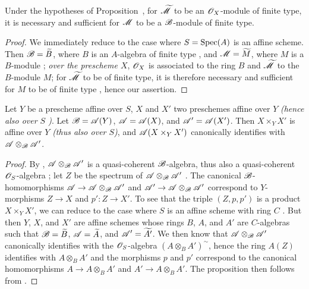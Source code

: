 \begin{corollary}[1.4.5]
\label{2.1.4.5}
Under the hypotheses of Proposition~, for $\widetilde{\mathscr{M}}$ to be an $\mathscr{O}_X$-module of finite type, it is necessary and sufficient for $\mathscr{M}$ to be a $\mathscr{B}$-module of finite type.
\end{corollary}

\begin{proof}
\label{proof-2.1.4.5}
We immediately reduce to the case where $S=\operatorname{Spec}(A)$ is an affine scheme.
Then $\mathscr{B}=\widetilde{B}$, where $B$ is an $A$-algebra of finite type , and $\mathscr{M}=\widetilde{M}$, where $M$ is a $B$-module ; \emph{over the prescheme $X$}, $\mathscr{O}_X$ is associated to the ring $B$ and $\widetilde{\mathscr{M}}$ to the $B$-module $M$; for $\widetilde{\mathscr{M}}$ to be of finite type, it is therefore necessary and sufficient for $M$ to be of finite type , hence our assertion.
\end{proof}

\begin{proposition}[1.4.6]
\label{2.1.4.6}
Let $Y$ be a prescheme affine over $S$, $X$ and $X'$ two preschemes affine over $Y$ \emph{(hence also over $S$ )}.
Let $\mathscr{B}=\mathscr{A}(Y)$, $\mathscr{A}=\mathscr{A}(X)$, and $\mathscr{A}'=\mathscr{A}(X')$.
Then $X\times_Y X'$ is affine over $Y$ \emph{(thus also over $S$)}, and $\mathscr{A}(X\times_Y X')$ canonically identifies with $\mathscr{A}\otimes_\mathscr{B}\mathscr{A}'$.
\end{proposition}

\begin{proof}
\label{proof-2.1.4.6}
By , $\mathscr{A}\otimes_\mathscr{B}\mathscr{A}'$ is a quasi-coherent $\mathscr{B}$-algebra, thus also a quasi-coherent $\mathscr{O}_S$-algebra ; let $Z$ be the spectrum of $\mathscr{A}\otimes_\mathscr{B}\mathscr{A}'$ .
The canonical $\mathscr{B}$-homomorphisms $\sh{A}\to\sh{A}\otimes_\sh{B}\sh{A}'$ and $\sh{A}'\to\sh{A}\otimes_\sh{B}\sh{A}'$ correspond  to $Y$-morphisms $Z\to X$ and $p':Z\to X'$.
To see that the triple $(Z,p,p')$ is a product $X\times_Y X'$, we can reduce to the case where $S$ is an affine scheme with ring $C$ .
But then $Y$, $X$, and $X'$ are affine schemes  whose rings $B$, $A$, and $A'$ are $C$-algebras such that $\mathscr{B}=\widetilde{B}$, $\mathscr{A}=\widetilde{A}$, and $\mathscr{A}'=\widetilde{A'}$.
We then know  that $\mathscr{A}\otimes_\mathscr{B}\mathscr{A}'$ canonically identifies with the $\mathscr{O}_S$-algebra $(A\otimes_B A')^\sim$, hence the ring $A(Z)$ identifies with $A\otimes_B A'$ and the morphisms $p$ and $p'$ correspond to the canonical homomorphisms $A\to A\otimes_B A'$ and $A'\to A\otimes_B A'$.
The proposition then follows from .
\end{proof}

